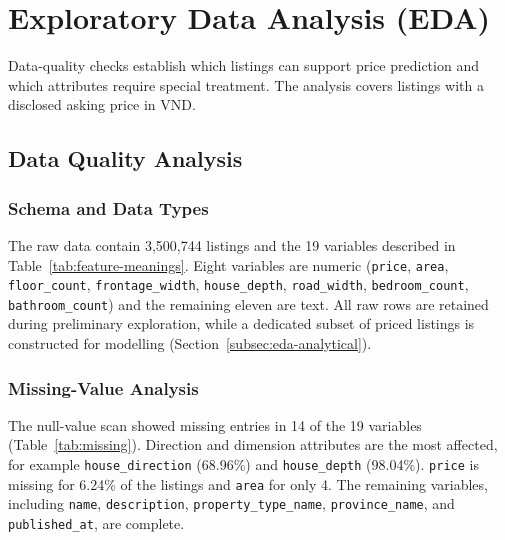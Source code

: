 \section{Exploratory Data Analysis (EDA)}
\label{sec:eda}

Data-quality checks establish which listings can support price prediction and which attributes require special treatment. The analysis covers listings with a disclosed asking price in VND.

\subsection{Data Quality Analysis}
\label{subsec:eda-quality}

\subsubsection{Schema and Data Types}

The raw data contain 3,500,744 listings and the 19 variables described in Table~\ref{tab:feature-meanings}. Eight variables are numeric (\texttt{price}, \texttt{area}, \texttt{floor\_count}, \texttt{frontage\_width}, \texttt{house\_depth}, \texttt{road\_width}, \texttt{bedroom\_count}, \texttt{bathroom\_count}) and the remaining eleven are text. All raw rows are retained during preliminary exploration, while a dedicated subset of priced listings is constructed for modelling (Section~\ref{subsec:eda-analytical}).

\subsubsection{Missing-Value Analysis}

The null-value scan showed missing entries in 14 of the 19 variables (Table~\ref{tab:missing}). Direction and dimension attributes are the most affected, for example \texttt{house\_direction} (68.96\%) and \texttt{house\_depth} (98.04\%). \texttt{price} is missing for 6.24\% of the listings and \texttt{area} for only 4. The remaining variables, including \texttt{name}, \texttt{description}, \texttt{property\_type\_name}, \texttt{province\_name}, and \texttt{published\_at}, are complete.

